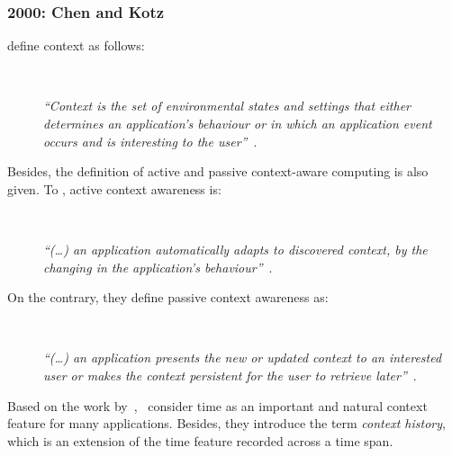 \subsubsection{2000: Chen and Kotz}
\label{sec:chen}

\citet{chen_survey_2000} define context as follows: 

\begin{description}
  \item[] \hfill \\
  \begin{mdframed}[hidealllines=true,backgroundcolor=gray!20]
  \textit{``Context is the set of environmental states and settings that either 
  determines an application’s behaviour or in which an application event occurs 
  and is interesting to the user''}~\citep{chen_survey_2000}.
  \end{mdframed}
\end{description}

Besides, the definition of active and passive context-aware computing is also 
given. To \citeauthor{chen_survey_2000}, active context awareness is:

\begin{description}
  \item[] \hfill \\
  \begin{mdframed}[hidealllines=true,backgroundcolor=gray!20]
  \textit{``(\dots) an application automatically adapts to discovered context, by the 
  changing in the application's behaviour''}~\citep{chen_survey_2000}.
  \end{mdframed}
\end{description}

On the contrary, they define passive context awareness as:

\begin{description}
  \item[] \hfill \\
  \begin{mdframed}[hidealllines=true,backgroundcolor=gray!20]
  \textit{``(\dots) an application presents the new or updated context to an interested
  user or makes the context persistent for the user to retrieve later''}~\citep{chen_survey_2000}.
  \end{mdframed}
\end{description}

Based on the work by~\citet{schilit_context_aware_1994},~\citet{chen_survey_2000}
consider time as an important and natural context feature for many 
applications. Besides, they introduce the term \textit{context history}, which 
is an extension of the time feature recorded across a time span.

